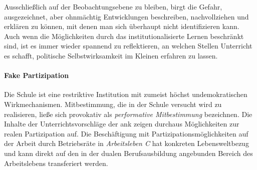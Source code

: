 Ausschließlich auf der Beobachtungsebene zu bleiben, birgt die Gefahr, ausgezeichnet, aber ohnmächtig Entwicklungen beschreiben, nachvollziehen und erklären zu können, mit denen man sich überhaupt nicht identifizieren kann. 
Auch wenn die Möglichkeiten durch das institutionalisierte Lernen beschränkt sind, ist es immer wieder spannend zu reflektieren, an welchen Stellen Unterricht es schafft, politische Selbstwirksamkeit im Kleinen erfahren zu lassen. 


\paragraph{Fake Partizipation \label{fakePartizipation}} %
Die Schule ist eine restriktive Institution mit zumeist höchst undemokratischen Wirkmechanismen.
Mitbestimmung, die in der Schule versucht wird zu realisieren, ließe sich provokativ als \emph{performative Mitbestimmung} bezeichnen. 
Die Inhalte der Unterrichtsvorschläge der \gls{ank} zeigen durchaus Möglichkeiten zur realen Partizipation auf. 
Die Beschäftigung mit Partizipationsmöglichkeiten auf der Arbeit durch Betriebsräte in \emph{Arbeitsleben C} hat konkreten Lebensweltbezug und kann direkt auf den in der dualen Berufsausbildung angebunden Bereich des Arbeitslebens transferiert werden. 
\bigskip

